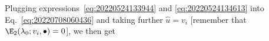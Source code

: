 Plugging expressions~\eqref{eq:20220524133944} and \eqref{eq:20220524134613} into Eq.~\eqref{eq:20220708060436} and
taking further $\hat{u} = v_i$ [remember that $\E_2(\lambda_0; v_i, \bullet) = 0$], we then get
